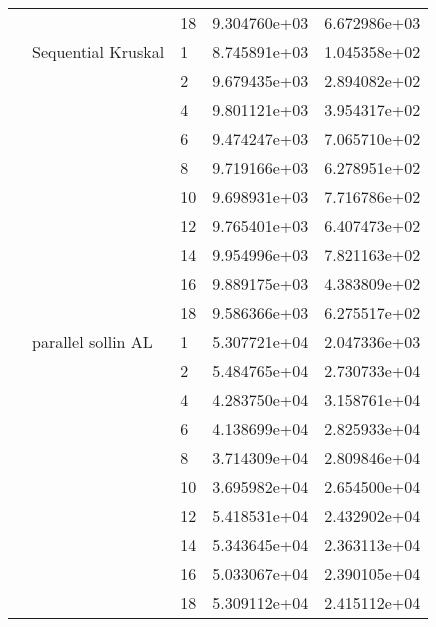 \begin{tabular}{lllrr}
                      &                     & 18 &  9.304760e+03 &  6.672986e+03 \\
                      & Sequential Kruskal & 1  &  8.745891e+03 &  1.045358e+02 \\
                      &                     & 2  &  9.679435e+03 &  2.894082e+02 \\
                      &                     & 4  &  9.801121e+03 &  3.954317e+02 \\
                      &                     & 6  &  9.474247e+03 &  7.065710e+02 \\
                      &                     & 8  &  9.719166e+03 &  6.278951e+02 \\
                      &                     & 10 &  9.698931e+03 &  7.716786e+02 \\
                      &                     & 12 &  9.765401e+03 &  6.407473e+02 \\
                      &                     & 14 &  9.954996e+03 &  7.821163e+02 \\
                      &                     & 16 &  9.889175e+03 &  4.383809e+02 \\
                      &                     & 18 &  9.586366e+03 &  6.275517e+02 \\
                      & parallel sollin AL & 1  &  5.307721e+04 &  2.047336e+03 \\
                      &                     & 2  &  5.484765e+04 &  2.730733e+04 \\
                      &                     & 4  &  4.283750e+04 &  3.158761e+04 \\
                      &                     & 6  &  4.138699e+04 &  2.825933e+04 \\
                      &                     & 8  &  3.714309e+04 &  2.809846e+04 \\
                      &                     & 10 &  3.695982e+04 &  2.654500e+04 \\
                      &                     & 12 &  5.418531e+04 &  2.432902e+04 \\
                      &                     & 14 &  5.343645e+04 &  2.363113e+04 \\
                      &                     & 16 &  5.033067e+04 &  2.390105e+04 \\
                      &                     & 18 &  5.309112e+04 &  2.415112e+04 \\

\end{tabular}
